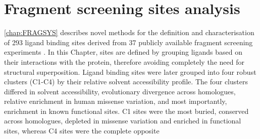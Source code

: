 \section{Fragment screening sites analysis}


\autoref{chap:FRAGSYS} describes novel methods for the definition and characterisation of 293 ligand binding sites derived from 37 publicly available fragment screening experiments \cite{UTGES_2024_FRAGSYS}. In this Chapter, sites are defined by grouping ligands based on their interactions with the protein, therefore avoiding completely the need for structural superposition. Ligand binding sites were later grouped into four robust clusters (C1-C4) by their relative solvent accessibility profile. The four clusters differed in solvent accessibility, evolutionary divergence across homologues, relative enrichment in human missense variation, and most importantly, enrichment in known functional sites. C1 sites were the most buried, conserved across homologues, depleted in missense variation and enriched in functional sites, whereas C4 sites were the complete opposite




